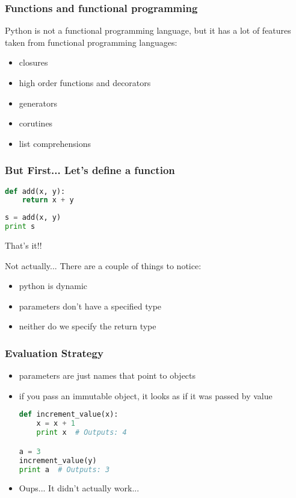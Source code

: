 \documentclass{beamer}
\begin{document}
\begin{frame}[fragile]
\frametitle{Functions and functional programming}
Python is not a functional programming language, but
it has a lot of features taken from functional
programming languages:
\begin{itemize}
  \item closures
  \item high order functions and decorators
  \item generators
  \item corutines
  \item list comprehensions
\end{itemize}

\end{frame}


\begin{frame}[fragile]
\frametitle{But First... Let's define a function}

\begin{lstlisting}[language=python]
def add(x, y):
    return x + y
\end{lstlisting}
\pause
\begin{lstlisting}[language=python]
s = add(x, y)
print s
\end{lstlisting}

\pause
\vspace{5 mm}
That's it!!


\pause
\vspace{5 mm}
Not actually... There are a couple of things to notice:
\begin{itemize}
  \item python is dynamic
  \item parameters don't have a specified type
  \item neither do we specify the return type
\end{itemize}
\begin{comment}
  Don't forget to add that any types that support the + 
  operator are acceptable
\end{comment}

\end{frame}


\begin{frame}[fragile]
\frametitle{Evaluation Strategy}

\begin{itemize}
  \item parameters are just names that point to objects
  \item if you pass an immutable object, it looks as if it was passed by value
\pause
\begin{lstlisting}[language=python]
def increment_value(x):
    x = x + 1
    print x  # Outputs: 4

a = 3
increment_value(y)
print a  # Outputs: 3 
\end{lstlisting}
  \item Oups... It didn't actually work...
\end{itemize}
\end{frame}
\end{document}
